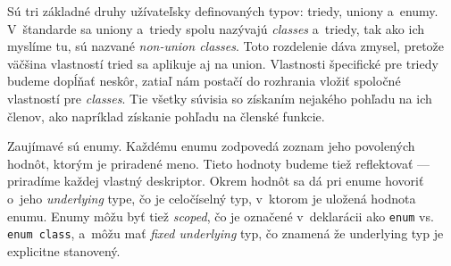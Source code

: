 Sú tri základné druhy užívateľsky definovaných typov: triedy, uniony a~enumy. V~štandarde sa uniony a~triedy spolu nazývajú \emph{classes} a~triedy, tak ako ich myslíme tu, sú nazvané \emph{non-union classes}. Toto rozdelenie dáva zmysel, pretože väčšina vlastností tried sa aplikuje aj na union. Vlastnosti špecifické pre triedy budeme dopĺňať neskôr, zatiaľ nám postačí do rozhrania vložiť spoločné vlastností pre \emph{classes}. Tie všetky súvisia so získaním nejakého pohľadu na ich členov, ako napríklad získanie pohľadu na členské funkcie.

Zaujímavé sú enumy. Každému enumu zodpovedá zoznam jeho povolených hodnôt, ktorým je priradené meno. Tieto hodnoty budeme tiež reflektovať --- priradíme každej vlastný deskriptor. Okrem hodnôt sa dá pri enume hovoriť o~jeho \emph{underlying} type, čo je celočíselný typ, v~ktorom je uložená hodnota enumu. Enumy môžu byť tiež \emph{scoped}, čo je označené v~deklarácii ako \texttt{enum} vs. \texttt{enum class}, a~môžu mať \emph{fixed underlying} typ, čo znamená že underlying typ je explicitne stanovený.

